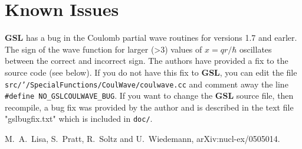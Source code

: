 \documentclass[10pt]{article}
\begin{document}
\section{Known Issues}

{\bf GSL} has a bug in the Coulomb partial wave routines for versions 1.7 and earler. The sign of the wave function for larger (>3) values of $x=qr/\hbar$ oscillates between the correct and incorrect sign. The authors have provided a fix to the source code (see below). If you do not have this fix to {\bf GSL}, you can edit the file {\tt src/'/SpecialFunctions/CoulWave/coulwave.cc} and comment away the line {\tt \#define NO\_GSLCOULWAVE\_BUG}. If you want to change the {\bf GSL} source file, then recompile, a bug fix was provided by the author and is described in the text file "gslbugfix.txt" which is included in  {\tt doc/}.

\begin{thebibliography}{99}
M.~A.~Lisa, S.~Pratt, R.~Soltz and U.~Wiedemann,
  arXiv:nucl-ex/0505014.
\end{thebibliography}
\end{document}
